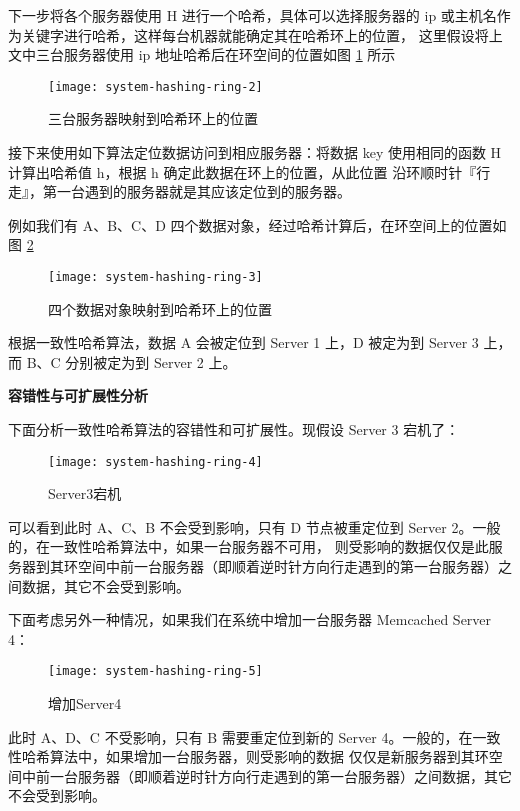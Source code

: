下一步将各个服务器使用 H 进行一个哈希，具体可以选择服务器的 ip 或主机名作为关键字进行哈希，这样每台机器就能确定其在哈希环上的位置，
这里假设将上文中三台服务器使用 ip 地址哈希后在环空间的位置如图 \ref{fig:system-hashing-ring-2} 所示

\begin{figure}[hbtp]
\centering
\texttt{[image: system-hashing-ring-2]}
\caption{三台服务器映射到哈希环上的位置}
\label{fig:system-hashing-ring-2}
\end{figure}

接下来使用如下算法定位数据访问到相应服务器：将数据 key 使用相同的函数 H 计算出哈希值 h，根据 h 确定此数据在环上的位置，从此位置
沿环顺时针『行走』，第一台遇到的服务器就是其应该定位到的服务器。

例如我们有 A、B、C、D 四个数据对象，经过哈希计算后，在环空间上的位置如图 \ref{fig:system-hashing-ring-3}

\begin{figure}[hbtp]
\centering
\texttt{[image: system-hashing-ring-3]}
\caption{四个数据对象映射到哈希环上的位置}
\label{fig:system-hashing-ring-3}
\end{figure}

根据一致性哈希算法，数据 A 会被定位到 Server 1 上，D 被定为到 Server 3 上，而 B、C 分别被定为到 Server 2 上。

\noindent\textbf{容错性与可扩展性分析}

下面分析一致性哈希算法的容错性和可扩展性。现假设 Server 3 宕机了：

\begin{figure}[hbtp]
\centering
\texttt{[image: system-hashing-ring-4]}
\caption{Server3宕机}
\label{fig:system-hashing-ring-4}
\end{figure}

可以看到此时 A、C、B 不会受到影响，只有 D 节点被重定位到 Server 2。一般的，在一致性哈希算法中，如果一台服务器不可用，
则受影响的数据仅仅是此服务器到其环空间中前一台服务器（即顺着逆时针方向行走遇到的第一台服务器）之间数据，其它不会受到影响。

下面考虑另外一种情况，如果我们在系统中增加一台服务器 Memcached Server 4：

\begin{figure}[hbtp]
\centering
\texttt{[image: system-hashing-ring-5]}
\caption{增加Server4}
\label{fig:system-hashing-ring-5}
\end{figure}

此时 A、D、C 不受影响，只有 B 需要重定位到新的 Server 4。一般的，在一致性哈希算法中，如果增加一台服务器，则受影响的数据
仅仅是新服务器到其环空间中前一台服务器（即顺着逆时针方向行走遇到的第一台服务器）之间数据，其它不会受到影响。


